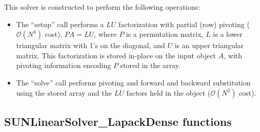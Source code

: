 This solver is constructed to perform the following operations:
\begin{itemize}
\item The ``setup'' call performs a $LU$ factorization with
  partial (row) pivoting ($\mathcal O(N^3)$ cost), $PA=LU$, where $P$
  is a permutation matrix, $L$ is a lower triangular matrix with 1's
  on the diagonal, and $U$ is an upper triangular matrix.  This
  factorization is stored in-place on the input {\sunmatdense} object
  $A$, with pivoting information encoding $P$ stored in
  the  array.
\item The ``solve'' call performs pivoting and forward and
  backward substitution using the stored  array and the
  $LU$ factors held in the {\sunmatdense} object ($\mathcal O(N^2)$
  cost).
\end{itemize}


\subsection{SUNLinearSolver\_LapackDense functions}
\label{ss:sunlinsol_lapdense_functions}

